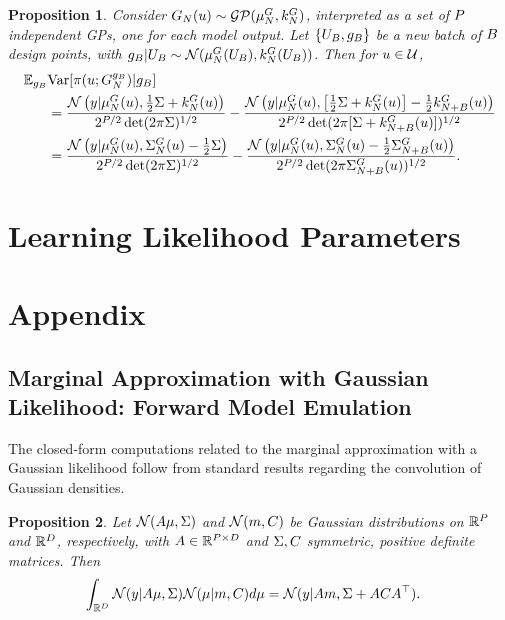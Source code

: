 \documentclass[12pt]{article}
\newtheorem{prop}{Proposition}
\begin{document}
\begin{prop} \label{prop:evar-fwd-emulation}
Consider 
$\fwdEm(\Par) \sim \GP(\emMean[\Ndesign]{\fwd}, \emKer[\Ndesign]{\fwd})$, interpreted as a set of $\dimObs$ independent 
GPs, one for each model output. Let $\{\designBatchIn, \designBatchFwd\}$ be a new batch of $\Nbatch$ 
design points, with
$\designBatchFwd | \designBatchIn \sim \Gaussian(\emMean[\Ndesign]{\fwd}(\designBatchIn), \emKer[\Ndesign]{\fwd}(\designBatchIn))$.
Then for $\Par \in \parSpace$, 
\begin{align*}
\E_{\designBatchFwd} &\Var[\postDens(\Par; \fwdEmCond{\designBatchFwd}) | \designBatchFwd] \\
&= \frac{\Gaussian\left(\obs | \emMean{\fwd}(\Par), \frac{1}{2}\likPar + \emKer{\fwd}(\Par) \right)}{2^{\dimObs/2} \det(2\pi \likPar)^{1/2}} - 
\frac{\Gaussian\left(\obs | \emMean{\fwd}(\Par), \left[\frac{1}{2}\likPar + \emKer{\fwd}(\Par)\right] - \frac{1}{2}\emKer[\Naugment]{\fwd}(\Par) \right)}{2^{\dimObs/2} \det(2\pi [\likPar + \emKer[\Naugment]{\fwd}(\Par)])^{1/2}} \\
&= \frac{\Gaussian\left(\obs | \emMean{\fwd}(\Par), \CovComb(\Par) - \frac{1}{2}\likPar \right)}{2^{\dimObs/2} \det(2\pi \likPar)^{1/2}} - 
\frac{\Gaussian\left(\obs | \emMean{\fwd}(\Par), \CovComb(\Par) - \frac{1}{2}\CovComb[\Naugment](\Par) \right)}{2^{\dimObs/2} \det(2\pi \CovComb[\Naugment](\Par))^{1/2}}.
\end{align*}
\end{prop}
 
\section{Learning Likelihood Parameters} \label{section_lik_par}

\section{Appendix}

\subsection{Marginal Approximation with Gaussian Likelihood: Forward Model Emulation}
The closed-form computations related to the marginal approximation with a Gaussian 
likelihood follow from standard results regarding the convolution of Gaussian densities.  

\begin{prop} \label{Gaussian_convolution}
Let $\Gaussian(A \mu, \likPar)$ and $\Gaussian(m, C)$ be Gaussian distributions on $\R^{\dimObs}$ and $\R^{\dimPar}$, 
respectively, with $A \in \R^{\dimObs \times \dimPar}$ and $\likPar, C$ symmetric, positive definite matrices. Then 
\begin{align*}
\int_{\R^{\dimPar}} \Gaussian(\obs | A \mu, \likPar) \Gaussian(\mu | m, C) d\mu
&= \Gaussian(\obs | Am, \likPar + ACA^\top). 
\end{align*}
\end{prop}
\end{document}
